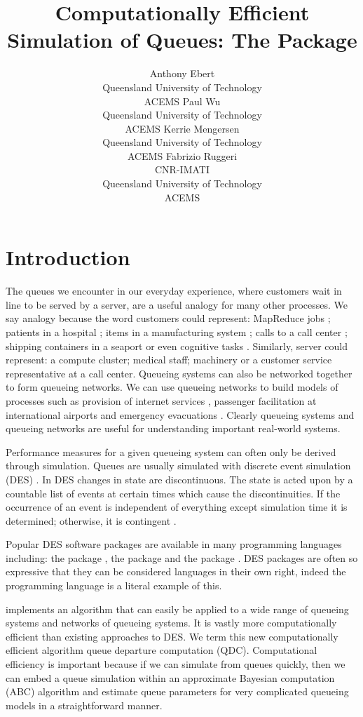 \documentclass[article]{jss}
\author{Anthony  Ebert\\Queensland University of Technology\\ACEMS \And 
        Paul Wu\\Queensland University of Technology\\ACEMS \AND
        Kerrie Mengersen\\Queensland University of Technology\\ACEMS \And
        Fabrizio Ruggeri\\CNR-IMATI\\Queensland University of Technology\\ACEMS}
\title{Computationally Efficient Simulation of Queues: The \proglang{R} Package \pkg{queuecomputer}}
\begin{document}
\section{Introduction}

The queues we encounter in our everyday experience, where customers wait in line to be served by a server, are a useful analogy for many other processes. We say analogy because the word customers could represent: MapReduce jobs \citep{lin_joint_2013}; patients in a hospital \citep{takagi_queueing_2016}; items in a manufacturing system \citep{dallery_manufacturing_1992}; calls to a call center \citep{gans_telephone_2003}; shipping containers in a seaport \citep{kozan_comparison_1997} or even cognitive tasks \citep{cao_queueing_2013}. Similarly, server could represent: a compute cluster; medical staff; machinery or a customer service representative at a call center. Queueing systems can also be networked together to form queueing networks. We can use queueing networks to build models of processes such as provision of internet services \citep{sutton_bayesian_2011}, passenger facilitation at international airports \citep{wu_review_2013} and emergency evacuations \citep{van_woensel_modeling_2007}. Clearly queueing systems and queueing networks are useful for understanding important real-world systems. 

Performance measures for a given queueing system can often only be derived through simulation. Queues are usually simulated with discrete event simulation (DES) \citep[pg. 226]{insua2012bayesian}. In DES changes in state are discontinuous. The state is acted upon by a countable list of events at certain times which cause the discontinuities. If the occurrence of an event is independent of everything except simulation time it is determined; otherwise, it is contingent \citep{nance1981time}. 

Popular DES software packages are available in many programming languages including: the  package  \citep{Rpkg_simmer}, the  \citep{van2011python} package  \citep{Ppkg_simpy} and the   \citep{gosling2000java} package  \citep{Jpkg_JMT}. DES packages are often so expressive that they can be considered languages in their own right, indeed the programming language  \citep{dahl1966simula} is a literal example of this. 

 \citep{Rpkg_queuecomputer} implements an algorithm that can easily be applied to a wide range of queueing systems and networks of queueing systems. It is vastly more computationally efficient than existing approaches to DES. We term this new computationally efficient algorithm queue departure computation (QDC). Computational efficiency is important because if we can simulate from queues quickly, then we can embed a queue simulation within an approximate Bayesian computation (ABC) algorithm \citep{sunnaker_approximate_2013} and estimate queue parameters for very complicated queueing models in a straightforward manner. 
\end{document}

